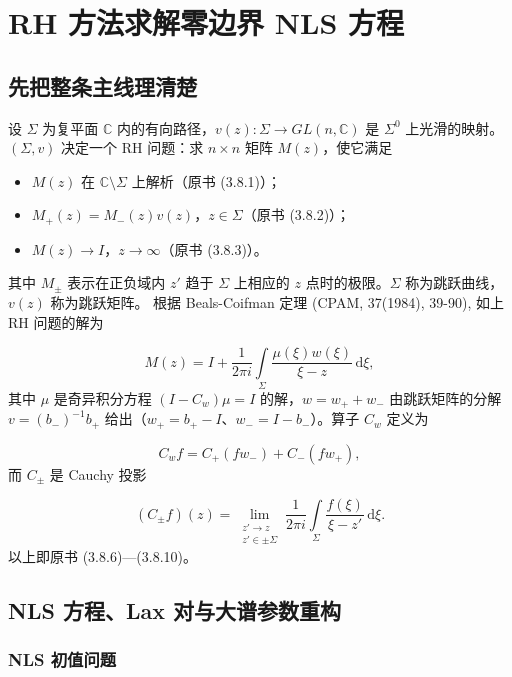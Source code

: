 \documentclass[
    lang=cn,
    scheme=chinese,
    mode=simple,
    device=normal,
    color=blue,
    math=cm,
    thmcnt=section,
    12pt,
    nowatermark
]{elegantbook}
\begin{document}
\setcounter{chapter}{4}

\chapter{RH 方法求解零边界 NLS 方程}

\section*{先把整条主线理清楚}

\begin{callout}
    设 $\Sigma$ 为复平面 $\mathbb{C}$ 内的有向路径，$v(z):\Sigma\to GL(n,\mathbb{C})$ 是 $\Sigma^0$ 上光滑的映射。
    $(\Sigma,v)$ 决定一个 RH 问题：求 $n\times n$ 矩阵 $M(z)$，使它满足

    \begin{itemize}
        \item $M(z)$ 在 $\mathbb{C}\setminus\Sigma$ 上解析（原书 (3.8.1)）；
        \item $M_+(z)=M_-(z)v(z)$，$z\in\Sigma$（原书 (3.8.2)）；
        \item $M(z)\to I$，$z\to\infty$（原书 (3.8.3)）。
    \end{itemize}

    其中 $M_\pm$ 表示在正负域内 $z'$ 趋于 $\Sigma$ 上相应的 $z$ 点时的极限。$\Sigma$ 称为跳跃曲线，$v(z)$ 称为跳跃矩阵。
    根据 Beals-Coifman 定理 (CPAM, 37(1984), 39-90), 如上 RH 问题的解为

    \[
        M(z)
        =
        I+\dfrac{1}{2\pi i}\int\limits_\Sigma\dfrac{\mu(\xi)w(\xi)}{\xi-z}\,\mathrm d\xi,
    \]
    其中 $\mu$ 是奇异积分方程 $(I-C_w)\mu=I$ 的解，$w=w_++w_-$ 由跳跃矩阵的分解 $v=(b_-)^{-1}b_+$ 给出（$w_+=b_+-I$、$w_-=I-b_-$）。算子 $C_w$ 定义为

    \[
        C_wf=C_+(fw_-)+C_-(fw_+),
    \]
    而 $C_\pm$ 是 Cauchy 投影

    \[
        (C_\pm f)(z)=\lim\limits_{\substack{z'\to z\\ z'\in\pm\Sigma}}\dfrac{1}{2\pi i}\int\limits_\Sigma\dfrac{f(\xi)}{\xi-z'}\,\mathrm d\xi.
    \]
    以上即原书 (3.8.6)---(3.8.10)。
\end{callout}

\section{NLS 方程、Lax 对与大谱参数重构}

\subsection{NLS 初值问题}
\end{document}
